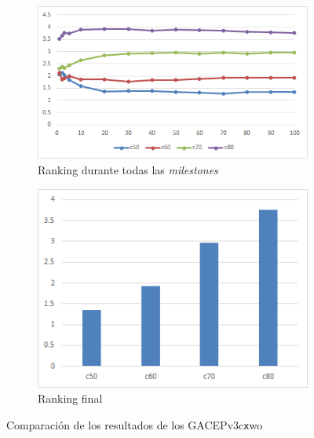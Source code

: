 \begin{figure}[h]
     \centering
     \begin{subfigure}[b]{0.45\textwidth}
         \centering
         \includegraphics[width=\textwidth]{imagenes/Experimental/GACEPcwoGRASP.png}
         \caption{Ranking durante todas las \textit{milestones}}
         \label{fig:GACEPv3cwo_lineas}
     \end{subfigure}
     \hfill
     \begin{subfigure}[b]{0.45\textwidth}
         \centering
         \includegraphics[width=\textwidth]{imagenes/Experimental/barras/GACEPcwoGRASP.png}
         \caption{Ranking final}
         \label{fig:GACEPv3cwo_barras}
     \end{subfigure}
        \caption{Comparación de los resultados de los GACEPv3c\texttt{x}wo}
        \label{fig:GACEPcwoGRASP}
\end{figure}

